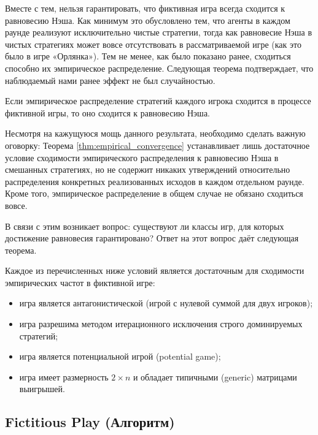 Вместе с тем, нельзя гарантировать, что фиктивная игра всегда сходится к равновесию Нэша. Как минимум это обусловлено тем, что агенты в каждом раунде реализуют исключительно чистые стратегии, тогда как равновесие Нэша в чистых стратегиях может вовсе отсутствовать в рассматриваемой игре (как это было в игре «Орлянка»). Тем не менее, как было показано ранее, сходиться способно их эмпирическое распределение. Следующая теорема подтверждает, что наблюдаемый нами ранее эффект не был случайностью.

\begin{theorem}
\label{thm:empirical_convergence}
Если эмпирическое распределение стратегий каждого игрока сходится в процессе фиктивной игры, то оно сходится к равновесию Нэша.
\end{theorem}

Несмотря на кажущуюся мощь данного результата, необходимо сделать важную оговорку: Теорема \ref{thm:empirical_convergence} устанавливает лишь достаточное условие сходимости эмпирического распределения к равновесию Нэша в смешанных стратегиях, но не содержит никаких утверждений относительно распределения конкретных реализованных исходов в каждом отдельном раунде. Кроме того, эмпирическое распределение в общем случае не обязано сходиться вовсе.

В связи с этим возникает вопрос: существуют ли классы игр, для которых достижение равновесия гарантировано? Ответ на этот вопрос даёт следующая теорема.

\begin{theorem}
Каждое из перечисленных ниже условий является достаточным для сходимости эмпирических частот в фиктивной игре:
\begin{itemize}
    \item игра является антагонистической (игрой с нулевой суммой для двух игроков);
    \item игра разрешима методом итерационного исключения строго доминируемых стратегий;
    \item игра является потенциальной игрой (potential game);
    \item игра имеет размерность $2 \times n$ и обладает типичными (generic) матрицами выигрышей.
\end{itemize}
\end{theorem} %

\subsection{Fictitious Play (Алгоритм)}
